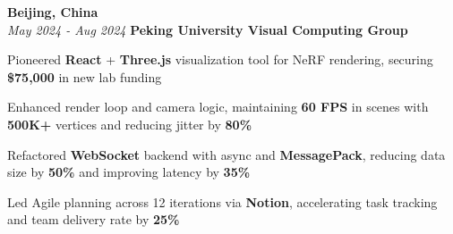 \vspace{0.2cm}

\begin{twocolentry}{
    \textbf{Beijing, China} \\
    \textit{May 2024 - Aug 2024}
}{
    \textbf{Peking University Visual Computing Group} \\
}
\end{twocolentry}
\begin{onecolentry}
    \begin{highlights}
        \item Pioneered \textbf{React} + \textbf{Three.js} visualization tool for NeRF rendering, securing \textbf{\$75,000} in new lab funding
        \item Enhanced render loop and camera logic, maintaining \textbf{60 FPS} in scenes with \textbf{500K+} vertices and reducing jitter by \textbf{80\%}
        \item Refactored \textbf{WebSocket} backend with async and \textbf{MessagePack}, reducing data size by \textbf{50\%} and improving latency by \textbf{35\%}
        \item Led Agile planning across 12 iterations via \textbf{Notion}, accelerating task tracking and team delivery rate by \textbf{25\%}
    \end{highlights}
\end{onecolentry}

